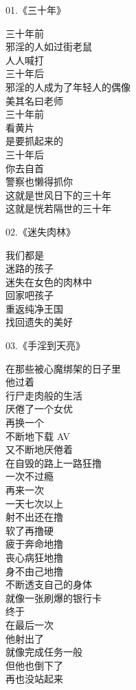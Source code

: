\documentclass{ctexart}
\begin{document}
\begin{multicols}{2}
    \begin{center}
        01.《三十年》\it

        三十年前 \\ 邪淫的人如过街老鼠 \\ 人人喊打
        ~\\
        三十年后 \\ 邪淫的人成为了年轻人的偶像 \\ 美其名曰老师
        ~\\
        三十年前 \\ 看黄片 \\ 是要抓起来的
        ~\\
        三十年后 \\ 你去自首 \\ 警察也懒得抓你
        ~\\
        这就是世风日下的三十年 \\ 这就是恍若隔世的三十年
    \end{center}

    \begin{center}
        02.《迷失肉林》\it

        我们都是 \\ 迷路的孩子 \\ 迷失在女色的肉林中 \\ 回家吧孩子 \\ 重返纯净王国 \\ 找回遗失的美好
    \end{center}

    \begin{center}
        03.《手淫到天亮》\it

        在那些被心魔绑架的日子里 \\ 他过着 \\ 行尸走肉般的生活 \\ 厌倦了一个女优 \\ 再换一个 \\ 不断地下载 AV \\ 又不断地厌倦着 \\ 在自毁的路上一路狂撸 \\ 一次不过瘾 \\ 再来一次 \\ 一天七次以上 \\ 射不出还在撸 \\ 软了再撸硬 \\ 疲于奔命地撸 \\ 丧心病狂地撸 \\ 身不由己地撸 \\ 不断透支自己的身体 \\ 就像一张刷爆的银行卡 \\ 终于 \\ 在最后一次 \\ 他射出了 \\ 就像完成任务一般 \\ 但他也倒下了 \\ 再也没站起来
    \end{center}


\end{multicols}
\end{document}
